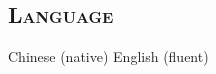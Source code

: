 \begin{resume}
\section{\textsc{Language}}
Chinese (native) \hspace{3cm} English (fluent)








\end{resume}


